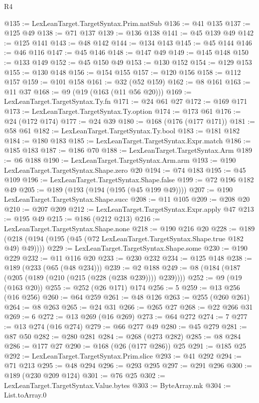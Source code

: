 \begin{lexlean}{R4}
\begin{coremodule}
@135 := LexLeanTarget.TargetSyntax.Prim.natSub
@136 := @41 @135
@137 := @125 @49
@138 := @71 @137
@139 := @136 @138
@141 := @45 @139 @49
@142 := @125 @141
@143 := @48 @142
@144 := @134 @143
@145 := @45 @144
@146 := @46 @116
@147 := @45 @146
@148 := @147 @49
@149 := @145 @148
@150 := @133 @149
@152 := @45 @150 @49
@153 := @130 @152
@154 := @129 @153
@155 := @130 @148
@156 := @154 @155
@157 := @120 @156
@158 := @112 @157
@159 := @101 @158
@161 := @32 (@52 @159)
@162 := @8 @161
@163 := @11 @37
@168 := @9 (@19 (@163 (@11 @56 @20)))
@169 := LexLeanTarget.TargetSyntax.Ty.fn
@171 := @24 @61 @27
@172 := @169 @171
@173 := LexLeanTarget.TargetSyntax.Ty.option
@174 := @173 @61
@176 := @24 (@172 @174)
@177 := @24 @39
@180 := @168 (@176 (@177 @171))
@181 := @58 @61
@182 := LexLeanTarget.TargetSyntax.Ty.bool
@183 := @181 @182
@184 := @180 @183
@185 := LexLeanTarget.TargetSyntax.Expr.match
@186 := @185 @183
@187 := @186 @70
@188 := LexLeanTarget.TargetSyntax.Arm
@189 := @6 @188
@190 := LexLeanTarget.TargetSyntax.Arm.arm
@193 := @190 LexLeanTarget.TargetSyntax.Shape.zero @20
@194 := @74 @183
@195 := @45 @109
@196 := LexLeanTarget.TargetSyntax.Shape.false
@199 := @72 @196 @182 @49
@205 := @189 (@193 (@194 (@195 (@45 @199 @49))))
@207 := @190 LexLeanTarget.TargetSyntax.Shape.succ
@208 := @11 @105
@209 := @208 @20
@210 := @207 @209
@212 := LexLeanTarget.TargetSyntax.Expr.apply @47
@213 := @195 @49
@215 := @186 (@212 @213)
@216 := LexLeanTarget.TargetSyntax.Shape.none
@218 := @190 @216 @20
@228 := @189 (@218 (@194 (@195 (@45 (@72 LexLeanTarget.TargetSyntax.Shape.true @182 @49) @49))))
@229 := LexLeanTarget.TargetSyntax.Shape.some
@230 := @190 @229
@232 := @11 @116 @20
@233 := @230 @232
@234 := @125 @148
@238 := @189 (@233 (@65 (@48 @234)))
@239 := @2 @188
@249 := @8 (@184 (@187 (@205 (@189 (@210 (@215 (@228 (@238 @239)))) @239))))
@252 := @9 (@19 (@163 @20))
@255 := @252 (@26 @171) @174
@256 := 5
@259 := @13 @256 (@16 @256)
@260 := @64 @259
@261 := @48 @126
@263 := @255 (@260 @261)
@264 := @8 @263
@265 := @24 @31
@266 := @265 @27
@268 := @22 @266 @31
@269 := 6
@272 := @13 @269 (@16 @269)
@273 := @64 @272
@274 := 7
@277 := @13 @274 (@16 @274)
@279 := @66 @277 @49
@280 := @45 @279
@281 := @87 @50
@282 := @280 @281
@284 := @268 (@273 @282)
@285 := @8 @284
@286 := @177 @27
@290 := @168 (@26 (@177 @286)) @25
@291 := @185 @25
@292 := LexLeanTarget.TargetSyntax.Prim.slice
@293 := @41 @292
@294 := @71 @213
@295 := @48 @294
@296 := @293 @295
@297 := @291 @296
@300 := @189 (@230 @209 @124)
@301 := @76 @25
@302 := LexLeanTarget.TargetSyntax.Value.bytes
@303 := ByteArray.mk
@304 := List.toArray.{0}

\end{coremodule}
\end{lexlean}
